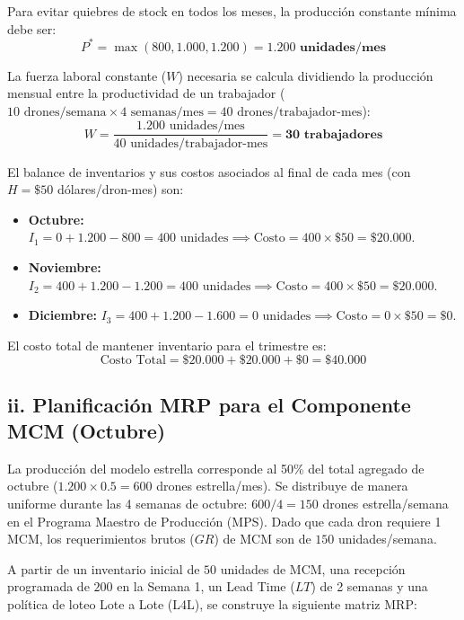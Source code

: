 \documentclass[11pt, a4paper]{article}
\begin{document}
Para evitar quiebres de stock en todos los meses, la producción constante mínima debe ser:
\[
  P^* = \max(800, 1.000, 1.200) = \mathbf{1.200 \text{ unidades/mes}}
\]

La fuerza laboral constante ($W$) necesaria se calcula dividiendo la producción mensual entre la productividad de un trabajador ($10 \text{ drones/semana} \times 4 \text{ semanas/mes} = 40 \text{ drones/trabajador-mes}$):
\[
  W = \frac{1.200 \text{ unidades/mes}}{40 \text{ unidades/trabajador-mes}} = \mathbf{30 \text{ trabajadores}}
\]

El balance de inventarios y sus costos asociados al final de cada mes (con $H = \$50$ dólares/dron-mes) son:
\begin{itemize}
  \item \textbf{Octubre:} $I_1 = 0 + 1.200 - 800 = 400 \text{ unidades} \implies \text{Costo} = 400 \times \$50 = \$20.000$.
  \item \textbf{Noviembre:} $I_2 = 400 + 1.200 - 1.200 = 400 \text{ unidades} \implies \text{Costo} = 400 \times \$50 = \$20.000$.
  \item \textbf{Diciembre:} $I_3 = 400 + 1.200 - 1.600 = 0 \text{ unidades} \implies \text{Costo} = 0 \times \$50 = \$0$.
\end{itemize}

El costo total de mantener inventario para el trimestre es:
\[
  \text{Costo Total} = \$20.000 + \$20.000 + \$0 = \mathbf{\$40.000}
\]

\subsection*{ii. Planificación MRP para el Componente MCM (Octubre)}

La producción del modelo estrella corresponde al 50\% del total agregado de octubre ($1.200 \times 0.5 = 600$ drones estrella/mes). Se distribuye de manera uniforme durante las 4 semanas de octubre: $600 / 4 = 150$ drones estrella/semana en el Programa Maestro de Producción (MPS). Dado que cada dron requiere 1 MCM, los requerimientos brutos ($GR$) de MCM son de $150$ unidades/semana.

A partir de un inventario inicial de $50$ unidades de MCM, una recepción programada de $200$ en la Semana 1, un Lead Time ($LT$) de 2 semanas y una política de loteo Lote a Lote (L4L), se construye la siguiente matriz MRP:
\end{document}
